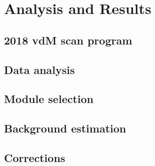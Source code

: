 \chapter{Analysis and Results}


\section{2018 vdM scan program}



\section{Data analysis}



\section{Module selection}


\section{Background estimation}



\section{Corrections}








